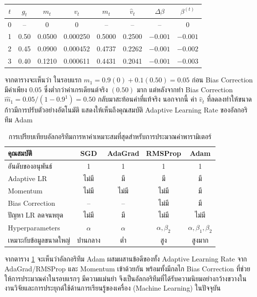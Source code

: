 \begin{center}
\renewcommand{\arraystretch}{1.4}
\begin{tabular}{|c|c|c|c|c|c|c|c|}
\hline
$t$ & $g_t$ & $m_t$ & $v_t$ & $\hat{m}_t$ & $\hat{v}_t$ & $\Delta\beta$ & $\beta^{(t)}$ \\
\hline
0 & -- & 0 & 0 & -- & -- & -- & 0 \\
\hline
1 & 0.50 & 0.0500 & 0.000250 & 0.5000 & 0.2500  & $-0.001$ & $-0.001$ \\
\hline
2 & 0.45 & 0.0900 & 0.000452 & 0.4737 & 0.2262  & $-0.001$ & $-0.002$ \\
\hline
3 & 0.40 & 0.1210 & 0.000611 & 0.4431 & 0.2041  & $-0.001$ & $-0.003$ \\
\hline
\end{tabular}
\end{center}

\noindent
จากตารางจะเห็นว่า ในรอบแรก $m_1 = 0.9(0) + 0.1(0.50) = 0.05$ ก่อน Bias Correction มีค่าเพียง $0.05$ ซึ่งต่ำกว่าค่าเกรเดียนต์จริง $(0.50)$ มาก แต่หลังจากทำ Bias Correction $\hat{m}_1 = 0.05/(1-0.9^1) = 0.50$ กลับมาสะท้อนค่าที่แท้จริง นอกจากนี้ ค่า $\hat{v}_t$ ที่ลดลงทำให้ขนาดก้าวมีการปรับตัวอย่างอัตโนมัติ แสดงให้เห็นถึงคุณสมบัติ Adaptive Learning Rate ของอัลกอริทึม Adam

\begin{table}[h!]
\centering
\caption{การเปรียบเทียบอัลกอริทึมการหาค่าเหมาะสมที่สุดสำหรับการประมาณค่าพารามิเตอร์}
\label{tab:optimizer_compare}
\renewcommand{\arraystretch}{1.3}
\small
\begin{tabular}{|l|c|c|c|c|}
\hline
\textbf{คุณสมบัติ} & \textbf{SGD} & \textbf{AdaGrad} & \textbf{RMSProp} & \textbf{Adam} \\
\hline
อันดับของอนุพันธ์ & 1 & 1 & 1 & 1 \\
\hline
Adaptive LR & ไม่มี & มี & มี & มี \\
\hline
Momentum & ไม่มี & ไม่มี & ไม่มี & มี \\
\hline
Bias Correction & -- & -- & ไม่มี & มี \\
\hline
ปัญหา LR ลดจนหยุด & ไม่มี & มี & ไม่มี & ไม่มี \\
\hline
Hyperparameters & $\alpha$ & $\alpha$ & $\alpha, \beta_2$ & $\alpha, \beta_1, \beta_2$ \\
\hline
เหมาะกับข้อมูลขนาดใหญ่ & ปานกลาง & ต่ำ & สูง & สูงมาก \\
\hline
\end{tabular}
\end{table}

\noindent
จากตาราง \ref{tab:optimizer_compare} จะเห็นว่าอัลกอริทึม Adam ผสมผสานข้อดีของทั้ง Adaptive Learning Rate จาก AdaGrad/RMSProp และ Momentum เข้าด้วยกัน พร้อมทั้งมีกลไก Bias Correction ที่ช่วยให้การประมาณค่าในรอบแรกๆ มีความแม่นยำ จึงเป็นอัลกอริทึมที่ได้รับความนิยมอย่างกว้างขวางในงานวิจัยและการประยุกต์ใช้ด้านการเรียนรู้ของเครื่อง (Machine Learning) ในปัจจุบัน

